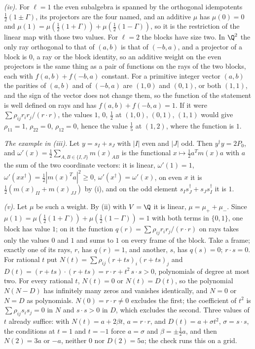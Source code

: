 \emph{(iv).} For $\ell = 1$ the even subalgebra is spanned by the orthogonal idempotents $\tfrac12(1 \pm \Gamma)$, its projectors are the four named, and an additive $\mu$ has $\mu(0) = 0$ and $\mu(1) = \mu(\tfrac12(1 + \Gamma)) + \mu(\tfrac12(1 - \Gamma))$, so it is the restriction of the linear map with those two values. For $\ell = 2$ the blocks have size two. In $\Q^{2}$ the only ray orthogonal to that of $(a, b)$ is that of $(-b, a)$, and a projector of a block is $0$, a ray or the block identity, so an additive weight on the even projectors is the same thing as a pair of functions on the rays of the two blocks, each with $f(a, b) + f(-b, a)$ constant. For a primitive integer vector $(a, b)$ the parities of $(a, b)$ and of $(-b, a)$ are $(1,0)$ and $(0,1)$, or both $(1,1)$, and the sign of the vector does not change them, so the function of the statement is well defined on rays and has $f(a, b) + f(-b, a) = 1$. If it were $\sum\rho_{ij}r_{i}r_{j}/(r \cdot r)$, the values $1$, $0$, $\tfrac12$ at $(1,0)$, $(0,1)$, $(1,1)$ would give $\rho_{11} = 1$, $\rho_{22} = 0$, $\rho_{12} = 0$, hence the value $\tfrac15$ at $(1, 2)$, where the function is $1$.

\emph{The example in (iii).} Let $y = s_{I} + s_{J}$ with $|I|$ even and $|J|$ odd. Then $y^{\dagger}y = 2P_{0}$, and $\omega'(x) = \tfrac12\sum_{A, B \in \{I, J\}}m(x)_{AB}$ is the functional $x \mapsto \tfrac12 a^{T}m(x)a$ with $a$ the sum of the two coordinate vectors: it is linear, $\omega'(1) = 1$, $\omega'(xx^{\dagger}) = \tfrac12|m(x)^{T}a|^{2} \ge 0$, $\omega'(x^{\dagger}) = \omega'(x)$, on even $x$ it is $\tfrac12(m(x)_{II} + m(x)_{JJ})$ by (i), and on the odd element $s_{I}s_{J}^{\dagger} + s_{J}s_{I}^{\dagger}$ it is $1$.

\emph{(v).} Let $\mu$ be such a weight. By (ii) with $V = \Q$ it is linear, $\mu = \mu_{+} + \mu_{-}$. Since $\mu(1) = \mu(\tfrac12(1 + \Gamma)) + \mu(\tfrac12(1 - \Gamma)) = 1$ with both terms in $\{0, 1\}$, one block has value $1$; on it the function $q(r) = \sum\rho_{ij}r_{i}r_{j}/(r \cdot r)$ on rays takes only the values $0$ and $1$ and sums to $1$ on every frame of the block. Take a frame; exactly one of its rays, $r$, has $q(r) = 1$, and another, $s$, has $q(s) = 0$; $r \cdot s = 0$. For rational $t$ put $N(t) = \sum\rho_{ij}(r + ts)_{i}(r + ts)_{j}$ and $D(t) = (r + ts) \cdot (r + ts) = r \cdot r + t^{2}\,s \cdot s > 0$, polynomials of degree at most two. For every rational $t$, $N(t) = 0$ or $N(t) = D(t)$, so the polynomial $N(N - D)$ has infinitely many zeros and vanishes identically, and $N = 0$ or $N = D$ as polynomials. $N(0) = r \cdot r \ne 0$ excludes the first; the coefficient of $t^{2}$ is $\sum\rho_{ij}s_{i}s_{j} = 0$ in $N$ and $s \cdot s > 0$ in $D$, which excludes the second. Three values of $t$ already suffice: with $N(t) = a + 2\beta t$, $a = r \cdot r$, and $D(t) = a + \sigma t^{2}$, $\sigma = s \cdot s$, the conditions at $t = 1$ and $t = -1$ force $a = \sigma$ and $\beta = \pm\tfrac12a$, and then $N(2) = 3a$ or $-a$, neither $0$ nor $D(2) = 5a$; the check runs this on a grid.
